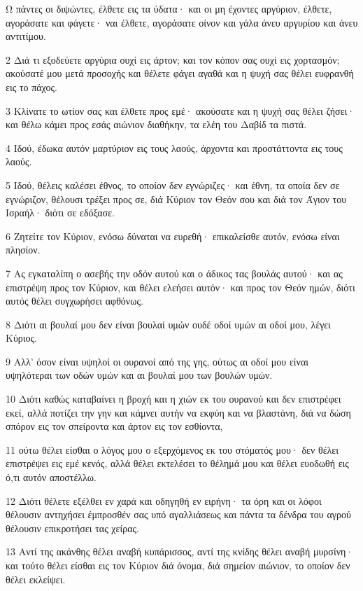 \par Ω πάντες οι διψώντες, έλθετε εις τα ύδατα· και οι μη έχοντες αργύριον, έλθετε, αγοράσατε και φάγετε· ναι έλθετε, αγοράσατε οίνον και γάλα άνευ αργυρίου και άνευ αντιτίμου.
\par 2 Διά τι εξοδεύετε αργύρια ουχί εις άρτον; και τον κόπον σας ουχί εις χορτασμόν; ακούσατέ μου μετά προσοχής και θέλετε φάγει αγαθά και η ψυχή σας θέλει ευφρανθή εις το πάχος.
\par 3 Κλίνατε το ωτίον σας και έλθετε προς εμέ· ακούσατε και η ψυχή σας θέλει ζήσει· και θέλω κάμει προς εσάς αιώνιον διαθήκην, τα ελέη του Δαβίδ τα πιστά.
\par 4 Ιδού, έδωκα αυτόν μαρτύριον εις τους λαούς, άρχοντα και προστάττοντα εις τους λαούς.
\par 5 Ιδού, θέλεις καλέσει έθνος, το οποίον δεν εγνώριζες· και έθνη, τα οποία δεν σε εγνώριζον, θέλουσι τρέξει προς σε, διά Κύριον τον Θεόν σου και διά τον Άγιον του Ισραήλ· διότι σε εδόξασε.
\par 6 Ζητείτε τον Κύριον, ενόσω δύναται να ευρεθή· επικαλείσθε αυτόν, ενόσω είναι πλησίον.
\par 7 Ας εγκαταλίπη ο ασεβής την οδόν αυτού και ο άδικος τας βουλάς αυτού· και ας επιστρέψη προς τον Κύριον, και θέλει ελεήσει αυτόν· και προς τον Θεόν ημών, διότι αυτός θέλει συγχωρήσει αφθόνως.
\par 8 Διότι αι βουλαί μου δεν είναι βουλαί υμών ουδέ οδοί υμών αι οδοί μου, λέγει Κύριος.
\par 9 Αλλ' όσον είναι υψηλοί οι ουρανοί από της γης, ούτως αι οδοί μου είναι υψηλότεραι των οδών υμών και αι βουλαί μου των βουλών υμών.
\par 10 Διότι καθώς καταβαίνει η βροχή και η χιών εκ του ουρανού και δεν επιστρέφει εκεί, αλλά ποτίζει την γην και κάμνει αυτήν να εκφύη και να βλαστάνη, διά να δώση σπόρον εις τον σπείροντα και άρτον εις τον εσθίοντα,
\par 11 ούτω θέλει είσθαι ο λόγος μου ο εξερχόμενος εκ του στόματός μου· δεν θέλει επιστρέψει εις εμέ κενός, αλλά θέλει εκτελέσει το θέλημά μου και θέλει ευοδωθή εις ό,τι αυτόν αποστέλλω.
\par 12 Διότι θέλετε εξέλθει εν χαρά και οδηγηθή εν ειρήνη· τα όρη και οι λόφοι θέλουσιν αντηχήσει έμπροσθέν σας υπό αγαλλιάσεως και πάντα τα δένδρα του αγρού θέλουσιν επικροτήσει τας χείρας.
\par 13 Αντί της ακάνθης θέλει αναβή κυπάρισσος, αντί της κνίδης θέλει αναβή μυρσίνη· και τούτο θέλει είσθαι εις τον Κύριον διά όνομα, διά σημείον αιώνιον, το οποίον δεν θέλει εκλείψει.

